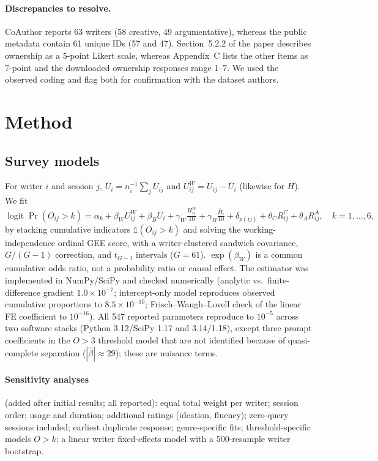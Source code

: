 \documentclass[10pt]{article}
\begin{document}
\paragraph{Discrepancies to resolve.} CoAuthor reports 63 writers (58 creative, 49 argumentative), whereas the public metadata contain 61 unique IDs (57 and 47). Section~5.2.2 of the paper describes ownership as a 5-point Likert scale, whereas Appendix~C lists the other items as 7-point and the downloaded ownership responses range 1--7. We used the observed coding and flag both for confirmation with the dataset authors.

\section{Method}
\subsection{Survey models}
For writer $i$ and session $j$, $\bar U_i = n_i^{-1}\sum_j U_{ij}$ and $U^W_{ij} = U_{ij}-\bar U_i$ (likewise for $H$). We fit
\begin{equation}
\operatorname{logit}\Pr(O_{ij}>k)=\alpha_k+\beta_W U^W_{ij}+\beta_B\bar U_i+\gamma_W\tfrac{H^W_{ij}}{10}+\gamma_B\tfrac{\bar H_i}{10}+\delta_{p(ij)}+\theta_C R^C_{ij}+\theta_A R^A_{ij},\quad k=1,\dots,6,
\end{equation}
by stacking cumulative indicators $\mathbb{1}(O_{ij}>k)$ and solving the working-independence ordinal GEE score, with a writer-clustered sandwich covariance, $G/(G{-}1)$ correction, and $t_{G-1}$ intervals ($G{=}61$).
$\exp(\beta_W)$ is a common cumulative odds ratio, not a probability ratio or causal effect.
The estimator was implemented in NumPy/SciPy and checked numerically (analytic vs.\ finite-difference gradient $1.0\times10^{-7}$; intercept-only model reproduces observed cumulative proportions to $8.5\times10^{-10}$; Frisch--Waugh--Lovell check of the linear FE coefficient to $10^{-16}$).
All 547 reported parameters reproduce to $10^{-5}$ across two software stacks (Python 3.12/SciPy 1.17 and 3.14/1.18), except three prompt coefficients in the $O>3$ threshold model that are not identified because of quasi-complete separation ($|\hat\beta|\approx 29$); these are nuisance terms.

\paragraph{Sensitivity analyses} (added after initial results; all reported): equal total weight per writer; session order; usage and duration; additional ratings (ideation, fluency); zero-query sessions included; earliest duplicate response; genre-specific fits; threshold-specific models $O>k$; a linear writer fixed-effects model with a 500-resample writer bootstrap.
\end{document}
